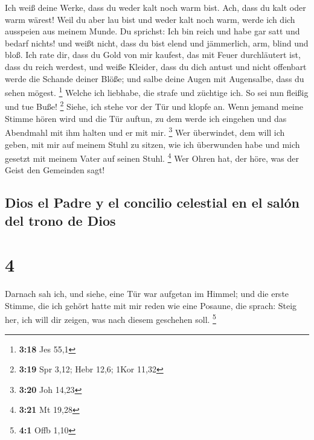  Ich weiß deine Werke, dass du weder kalt noch warm bist.
Ach, dass du kalt oder warm wärest!  Weil du aber lau
bist und weder kalt noch warm, werde ich dich ausspeien aus meinem
Munde.  Du sprichst: Ich bin reich und habe gar satt und
bedarf nichts! und weißt nicht, dass du bist elend und jämmerlich, arm,
blind und bloß.  Ich rate dir, dass du Gold von mir
kaufest, das mit Feuer durchläutert ist, dass du reich werdest, und
weiße Kleider, dass du dich antust und nicht offenbart werde die Schande
deiner Blöße; und salbe deine Augen mit Augensalbe, dass du sehen
mögest. \footnote{\textbf{3:18} Jes 55,1}  Welche ich
liebhabe, die strafe und züchtige ich. So sei nun fleißig und tue Buße!
\footnote{\textbf{3:19} Spr 3,12; Hebr 12,6; 1Kor 11,32} 
Siehe, ich stehe vor der Tür und klopfe an. Wenn jemand meine Stimme
hören wird und die Tür auftun, zu dem werde ich eingehen und das
Abendmahl mit ihm halten und er mit mir. \footnote{\textbf{3:20} Joh
  14,23}  Wer überwindet, dem will ich geben, mit mir auf
meinem Stuhl zu sitzen, wie ich überwunden habe und mich gesetzt mit
meinem Vater auf seinen Stuhl. \footnote{\textbf{3:21} Mt 19,28}
 Wer Ohren hat, der höre, was der Geist den Gemeinden
sagt!

\hypertarget{dios-el-padre-y-el-concilio-celestial-en-el-saluxf3n-del-trono-de-dios}{%
\subsection{Dios el Padre y el concilio celestial en el salón del trono
de
Dios}\label{dios-el-padre-y-el-concilio-celestial-en-el-saluxf3n-del-trono-de-dios}}

\hypertarget{section-3}{%
\section{4}\label{section-3}}

 Darnach sah ich, und siehe, eine Tür war aufgetan im
Himmel; und die erste Stimme, die ich gehört hatte mit mir reden wie
eine Posaune, die sprach: Steig her, ich will dir zeigen, was nach
diesem geschehen soll. \footnote{\textbf{4:1} Offb 1,10}

